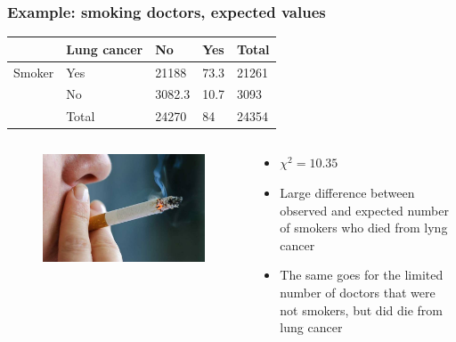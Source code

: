 \documentclass{beamer}
\begin{document}
\begin{frame}
  \frametitle{Example: smoking doctors, expected values}
  
\begin{table}[h]
\begin{tabular}{@{}lllll@{}}
\toprule
      & \textbf{Lung cancer} & \textbf{No} & \textbf{Yes} & \textbf{Total} \\ \midrule
Smoker & Yes                 & 21188         & 73.3         & 21261           \\
      & No                & 3082.3        & 10.7         & 3093            \\
      & Total              & 24270         & 84           & 24354           \\ \bottomrule
\end{tabular}
\end{table}

\begin{columns}
  \begin{column}{0.3 \textwidth}

  \begin{figure}
    \centering
      \includegraphics[width=1.00\textwidth]{img/les-6-smoking.jpg}
  \end{figure}

  \end{column}
  \begin{column}{0.7 \textwidth}

  \begin{itemize}
    \item $\chi^{2} = 10.35$
    \item Large difference between observed and expected number of smokers who died from lyng cancer
    \item The same goes for the limited number of doctors that were not smokers, but did die from lung cancer
  \end{itemize}
  \end{column}
\end{columns}
\end{frame}
\end{document}
